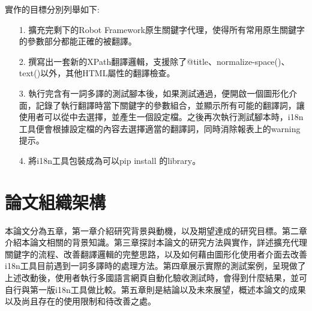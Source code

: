 實作的目標分別列舉如下:
\begin{itemize}
\item[1.] 擴充完剩下的Robot Framework原生關鍵字代理，使得所有常用原生關鍵字的參數部分都能正確的被翻譯。
\item[2.] 撰寫出一套新的XPath翻譯邏輯，支援除了@title、normalize-space()、text()以外，其他HTML屬性的翻譯檢查。
\item[3.] 執行完含有一詞多譯的測試腳本後，如果測試通過，便開啟一個圖形化介面，記錄了執行翻譯時當下關鍵字的參數組合，並顯示所有可能的翻譯詞，讓使用者可以從中去選擇，並產生一個設定檔。之後再次執行測試腳本時，i18n工具便會根據設定檔的內容去選擇適當的翻譯詞，同時消除報表上的warning提示。 
\item[4.] 將i18n工具包裝成為可以pip\cite{PIP} install 的library。
\end{itemize}

\section{論文組織架構}
本論文分為五章，第一章介紹研究背景與動機，以及期望達成的研究目標。第二章介紹本論文相關的背景知識。第三章探討本論文的研究方法與實作，詳述擴充代理關鍵字的流程、改善翻譯邏輯的完整思路，以及如何藉由圖形化使用者介面去改善i18n工具目前遇到一詞多譯時的處理方法。第四章展示實際的測試案例，呈現做了上述改動後，使用者執行多國語言網頁自動化驗收測試時，會得到什麼結果，並可自行與第一版i18n工具\cite{i18n}做比較。第五章則是結論以及未來展望，概述本論文的成果以及尚且存在的使用限制和待改善之處。
